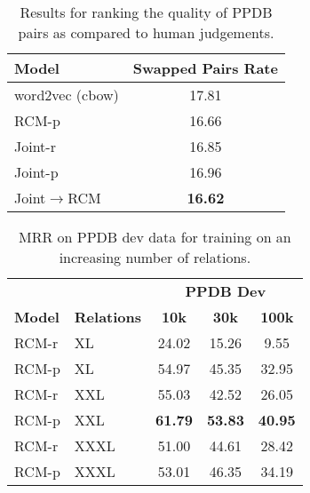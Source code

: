 \documentclass[11pt]{article}
\begin{document}
\begin{table}[!t]
\small
\centering
	\begin{tabular}{|l|c|}
	\hline
	\bf Model &  \bf Swapped Pairs Rate  \\
	\hline
	word2vec (cbow) & 17.81  \\
	\hline
	RCM-p & 16.66  \\
	Joint-r & 16.85   \\
	Joint-p & 16.96   \\
	Joint$\rightarrow$RCM & \bf 16.62 \\
	\hline
	\end{tabular}
\caption{Results for ranking the quality of PPDB pairs as compared to human judgements.}
\label{tab:res_rank}
\vspace{+.1cm}
\end{table}



\begin{table}[t]
\small
\centering
	\begin{tabular}{|ll|c|c|c|}
	\hline
	 & &  \multicolumn{3}{|c|}{\bf PPDB Dev } \\
	\cline{3-5}
	{\bf Model} & {\bf Relations} & \bf 10k & \bf 30k & \bf 100k \\
	\hline
        RCM-r  &XL &24.02 & 15.26& 9.55  \\ 
	RCM-p &XL & 54.97 & 45.35 & 32.95  \\
        RCM-r  &XXL &55.03 & 42.52& 26.05  \\ 
	RCM-p &XXL & \bf 61.79 & \bf 53.83 & \bf 40.95  \\
        RCM-r  &XXXL &51.00 & 44.61& 28.42  \\ 
	RCM-p &XXXL & 53.01 & 46.35 & 34.19  \\
	\hline
	\end{tabular}
\caption{MRR on PPDB dev data for training on an increasing number of relations.}
\label{tab:res_ppdb_size}
\vspace{-.1cm}
\end{table}


\end{document}
